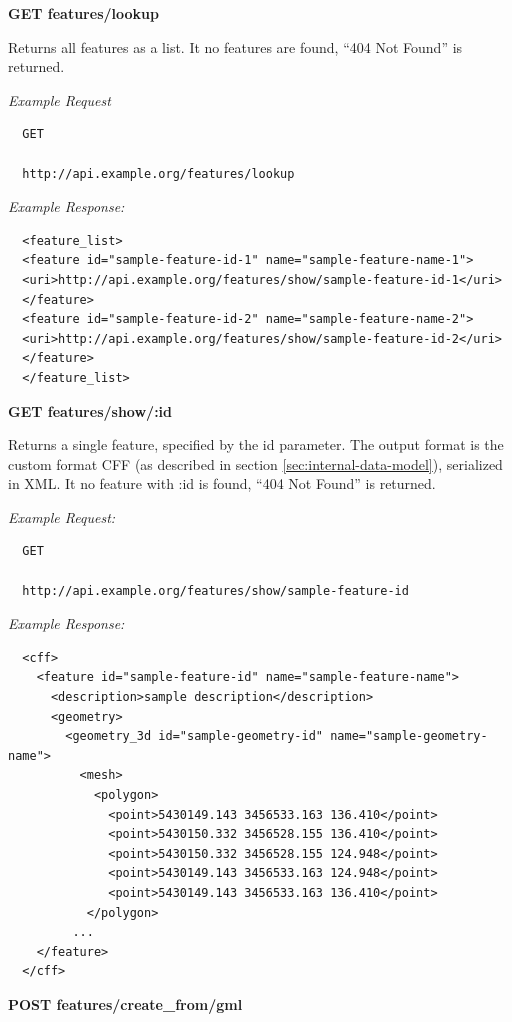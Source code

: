 \documentclass[paper=a4, fontsize=11pt]{scrartcl} %
\numberwithin{equation}{section} %
\numberwithin{figure}{section} %
\numberwithin{table}{section} %
\begin{document}
\vspace{1em} \large{\textbf{GET features/lookup}}  \normalsize 

Returns all features as a list. It no features are found, \textrm{``404 Not Found''} is returned.

\textsl{Example Request}
\begin{verbatim}
  GET

  http://api.example.org/features/lookup
\end{verbatim}

\textsl{Example Response:}
\begin{verbatim}
  <feature_list>
  <feature id="sample-feature-id-1" name="sample-feature-name-1">
  <uri>http://api.example.org/features/show/sample-feature-id-1</uri>
  </feature>
  <feature id="sample-feature-id-2" name="sample-feature-name-2">
  <uri>http://api.example.org/features/show/sample-feature-id-2</uri>
  </feature>
  </feature_list>
\end{verbatim}


\vspace{1em} \large{\textbf{GET features/show/:id}}  \normalsize 

Returns a single feature, specified by the id parameter. The output format is the custom format CFF (as described in section \ref{sec:internal-data-model}), serialized in XML. It no feature with \textrm{:id} is found, \textrm{``404 Not Found''} is returned.

\textsl{Example Request:}
\begin{verbatim}
  GET

  http://api.example.org/features/show/sample-feature-id
\end{verbatim}

\textsl{Example Response:}
\begin{verbatim}
  <cff>
    <feature id="sample-feature-id" name="sample-feature-name">
      <description>sample description</description>
      <geometry>
        <geometry_3d id="sample-geometry-id" name="sample-geometry-name">
          <mesh>
            <polygon>
              <point>5430149.143 3456533.163 136.410</point>
              <point>5430150.332 3456528.155 136.410</point>
              <point>5430150.332 3456528.155 124.948</point>
              <point>5430149.143 3456533.163 124.948</point>
              <point>5430149.143 3456533.163 136.410</point>
           </polygon>
         ...
    </feature>
  </cff>
\end{verbatim}
\vspace{1em} \large{\textbf{POST features/create\_from/gml}}  \normalsize 
\end{document}
